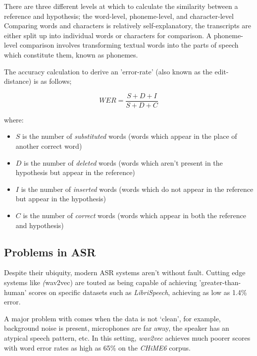 There are three different levels at which to calculate the similarity between a reference and hypothesis; the word-level, phoneme-level, and character-level\cite{fang2020}
Comparing words and characters is relatively self-explanatory, the transcripts are either split up into individual words or characters for comparison.
A phoneme-level comparison involves transforming textual words into the parts of speech which constitute them, known as phonemes.

The accuracy calculation to derive an 'error-rate' (also known as the edit-distance\cite{niessen2000evaluation}) is as follows;

\[WER = \frac{S + D + I}{S + D + C}\]

where:

\begin{itemize}
  \item $S$ is the number of \emph{substituted} words (words which appear in the place of another correct word)
  \item $D$ is the number of \emph{deleted} words (words which aren't present in the hypothesis but appear in the reference)
  \item $I$ is the number of \emph{inserted} words (words which do not appear in the reference but appear in the hypothesis)
  \item $C$ is the number of \emph{correct} words (words which appear in both the reference and hypothesis)
\end{itemize}

\subsection{Problems in ASR}

Despite their ubiquity, modern ASR systems aren't without fault.
Cutting edge systems like \emph(wav2vec) are touted as being capable of achieving 'greater-than-human' scores on specific datasets\cite{wav2vec2,bigssl,chung2021} such as \emph{LibriSpeech}\cite{librispeech}, achieving as low as 1.4\% error\cite{zhang2020}.

A major problem with comes when the data is not `clean', for example, background noise is present, microphones are far away, the speaker has an atypical speech pattern, etc. 
In this setting, \emph{wav2vec} achieves much poorer scores with word error rates as high as 65\%\cite{whisper} on the \emph{CHiME6} corpus\cite{chime6}.


